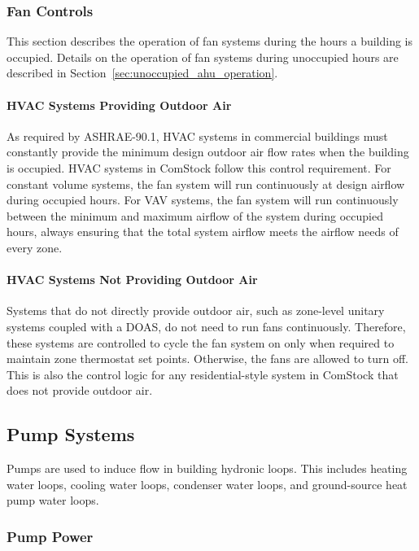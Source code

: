 \subsubsection{Fan Controls}

This section describes the operation of fan systems during the hours a building is occupied. Details on the operation of fan systems during unoccupied hours are described in Section~\ref{sec:unoccupied_ahu_operation}.

\paragraph{HVAC Systems Providing Outdoor Air}

As required by ASHRAE-90.1, HVAC systems in commercial buildings must constantly provide the minimum design outdoor air flow rates when the building is occupied. HVAC systems in ComStock follow this control requirement. For constant volume systems, the fan system will run continuously at design airflow during occupied hours. For VAV systems, the fan system will run continuously between the minimum and maximum airflow of the system during occupied hours, always ensuring that the total system airflow meets the airflow needs of every zone.

\paragraph{HVAC Systems Not Providing Outdoor Air}

Systems that do not directly provide outdoor air, such as zone-level unitary systems coupled with a DOAS, do not need to run fans continuously. Therefore, these systems are controlled to cycle the fan system on only when required to maintain zone thermostat set points. Otherwise, the fans are allowed to turn off. This is also the control logic for any residential-style system in ComStock that does not provide outdoor air.

\subsection{Pump Systems}

Pumps are used to induce flow in building hydronic loops. This includes heating water loops, cooling water loops, condenser water loops, and ground-source heat pump water loops.

\subsubsection{Pump Power}


